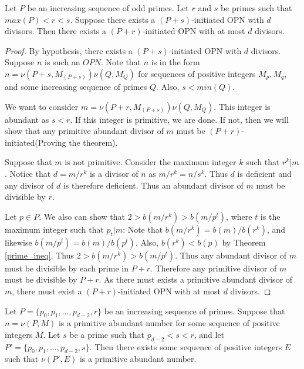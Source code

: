 \documentclass[../paper.tex]{subfiles}
\begin{document}
\begin{theorem}
\label{Divisibility}
Let $P$ be an increasing sequence of odd primes. Let $r$ and $s$ be
primes such that $max(P) < r < s$. Suppose there exists a $(P +
s)$-initiated OPN with $d$ divisors. Then there exists a $(P +
r)$-initiated OPN with at most $d$ divisors. 
\end{theorem}

\begin{proof}
By hypothesis, there exists a $(P + s)$-initiated OPN with $d$ divisors.
Suppose $n$ is such an $OPN$. Note that $n$ is in the form $n =
\nu(P + s, M_{(P + s)}) \nu(Q, M_Q)$ for sequences of positive 
integers $M_p, M_q$, and some increasing sequence of primes $Q$.
Also, $s < min(Q)$.

  We want to consider $m = \nu(P + r, M_{(P + s)}) \nu(Q, M_Q)$. 
This integer is abundant as $s < r$. If this integer is primitive,
we are done. If not, then we will show that any primitive abundant
divisor of $m$ must be $(P + r)$-initiated(Proving the theorem).

  Suppose that $m$ is not primitive. Consider the maximum integer
$k$ such that $r^k | m$. Notice that $d = m / r^k$ is a divisor of $n$
as $m / r^k = n / s^k$. Thus $d$ is deficient and any divisor of
$d$ is therefore deficient. Thus an abundant divisor of $m$ must
be divisible by $r$.

Let $p \in P$.  We also can show that $2 > b(m / r^k) > b(m / p^t)$, 
where $t$ is the maximum integer such that $p_t | m$: Note that
$b(m / r^k) = b(m) / b(r^k)$, and likewise $b(m / p^t) = b(m) /
b(p^t)$. Also, $b(r^k) < b(p)$ by Theorem {\ref{prime_ineq}}. Thus
$2 > b(m / r^k) > b(m / p^t)$. Thus any abundant divisor of $m$
must be divisible by each prime in $P + r$. Therefore any
primitive divisor of $m$ must be divisible by $P + r$. As
there must exists a primitive abundant divisor of $m$, there must
exist a $(P + r)$-initiated OPN with at most $d$ divisors.
\end{proof}

\begin{coro}\label{Continuity}
Let $P = \{p_0, p_1, ..., p_{d-2}, r\}$ be an increasing sequence 
of primes. Suppose that $n = \nu(P, M)$ is a primitive abundant 
number for some sequence of positive integers $M$. Let $s$ be a 
prime such that $p_{d-2} < s < r$, and let $P' = \{p_0, p_1,...,
p_{d-2}, s\}$. Then there exists some sequence of positive integers
$E$ such that $\nu(P', E)$ is a primitive abundant number.
\end{coro}
\end{document}
